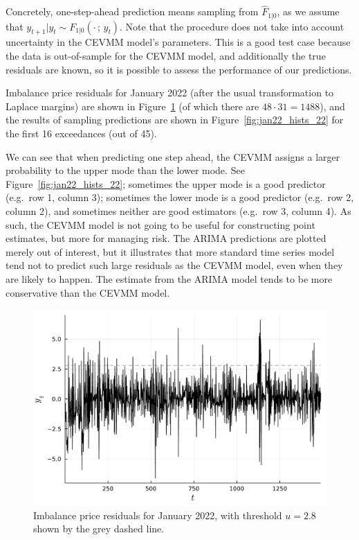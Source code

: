 \documentclass[11pt,twoside,openany]{book}
\numberwithin{Theorem}{chapter}
\numberwithin{Definition}{chapter}
\numberwithin{Lemma}{chapter}
\numberwithin{Algorithm}{chapter}
\numberwithin{equation}{chapter}
\begin{document}
Concretely, one-step-ahead prediction means sampling from $\hat F_{1|0}$,
as we assume that $y_{t+1}|y_{t} \sim F_{1|0}(\cdot\,;\,y_t)$.
Note that the procedure does not take into account uncertainty in the CEVMM
model's parameters.
This
is a good test case because the data is out-of-sample for the CEVMM model,
and additionally the true residuals are known, so it is possible to assess the
performance of our predictions.

Imbalance price residuals for January 2022 (after the usual transformation to Laplace
margins) are shown in Figure~\ref{fig:jan22_resids} (of which there are
$48\cdot31 = 1488$), and the results of sampling predictions are
shown in Figure~\ref{fig:jan22_hists_22} for the first 16 exceedances (out of 45).


We can see that when predicting one step ahead, the CEVMM assigns
a larger probability to the upper mode than the lower mode.
See Figure~\ref{fig:jan22_hists_22};
sometimes the upper mode is a good predictor (e.g.\ row 1, column 3);
sometimes the lower mode is a good predictor (e.g.\ row 2, column 2),
and sometimes neither are good estimators (e.g.\ row 3, column 4).
As such, the CEVMM model is not going to be useful for
constructing point estimates, but more for managing risk.
The ARIMA predictions are plotted merely out of interest, but it illustrates
that more standard time series model tend not to predict such large residuals
as the CEVMM model, even when they are likely to happen.
The estimate from the ARIMA model tends to be more conservative than the CEVMM model.

\begin{figure}[htp]
  \centering
  \includegraphics[scale=0.70]{../elexon/figures/resids_jan_22.pdf}
  \caption{Imbalance price residuals for January 2022, with threshold $u=2.8$ shown by the grey dashed line.}\label{fig:jan22_resids}
\end{figure}
\end{document}
